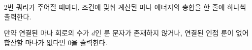 $2$번 쿼리가 주어질 때마다, 조건에 맞춰 계산된 마나 에너지의 총합을 한 줄에 하나씩 출력한다.

만약 연결된 마나 회로의 수가 $d$인 룬 문자가 존재하지 않거나, 연결된 인접 룬이 없어 합산할 마나가 없다면 $0$을 출력한다.